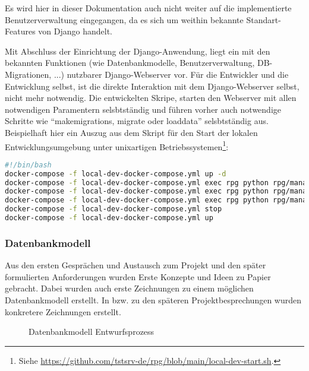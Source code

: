 Es wird hier in dieser Dokumentation auch nicht weiter auf die implementierte Benutzerverwaltung eingegangen, da es sich um weithin bekannte Standart-Features von Django handelt.

Mit Abschluss der Einrichtung der Django-Anwendung, liegt ein mit den bekannten Funktionen (wie Datenbankmodelle, Benutzerverwaltung, DB-Migrationen, ...) nutzbarer Django-Webserver vor. 
Für die Entwickler und die Entwicklung selbst, ist die direkte Interaktion mit dem Django-Webserver selbst, nicht mehr notwendig. Die entwickelten Skripe, starten den Webserver mit allen notwendigen Paramentern selsbtständig und führen vorher auch notwendige Schritte wie \enquote{makemigrations, migrate oder loaddata} selsbtständig aus. Beispielhaft hier ein Auszug aus dem Skript für den Start der lokalen Entwicklungsumgebung unter unixartigen Betriebssystemen\footnote{Siehe \url{https://github.com/tstsrv-de/rpg/blob/main/local-dev-start.sh}.}: 

\begin{lstlisting}[language=bash]
#!/bin/bash
docker-compose -f local-dev-docker-compose.yml up -d
docker-compose -f local-dev-docker-compose.yml exec rpg python rpg/manage.py makemigrations
docker-compose -f local-dev-docker-compose.yml exec rpg python rpg/manage.py migrate
docker-compose -f local-dev-docker-compose.yml exec rpg python rpg/manage.py loaddata db_sample_data.json
docker-compose -f local-dev-docker-compose.yml stop
docker-compose -f local-dev-docker-compose.yml up 
\end{lstlisting}


\subsubsection{Datenbankmodell}

Aus den ersten Gesprächen und Austausch zum Projekt und den später formulierten Anforderungen wurden Erste Konzepte und Ideen zu Papier gebracht. Dabei wurden auch erste Zeichnungen zu einem möglichen Datenbankmodell erstellt. In bzw. zu den späteren Projektbesprechungen wurden konkretere Zeichnungen erstellt. 

\begin{figure}[H]
    \centering
    \label{fig:henning-entwurf-datenbankmodell}
    \caption{Datenbankmodell Entwurfsprozess}
\end{figure}


